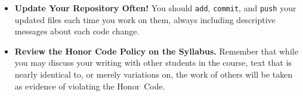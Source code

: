 \begin{itemize}
\item {\bf Update Your Repository Often!} You should {\tt add}, {\tt commit}, and {\tt push} your updated files each
  time you work on them, always including descriptive messages about each code change.

\item {\bf Review the Honor Code Policy on the Syllabus.} Remember that while you may discuss your writing with other
  students in the course, text that is nearly identical to, or merely variations on, the work of others will be
  taken as evidence of violating the \mbox{Honor Code}.

\end{itemize}

